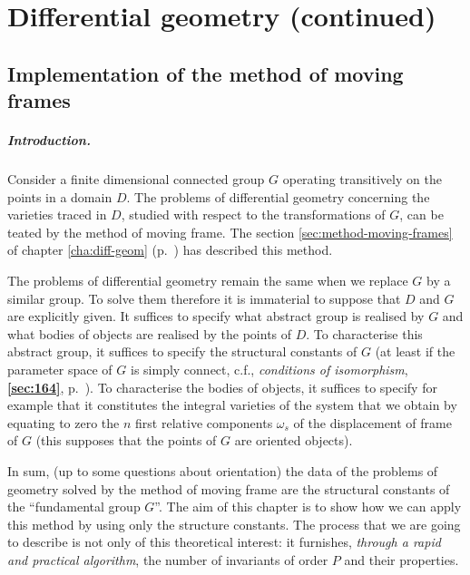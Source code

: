 \documentclass[leqno,11pt]{book}
\numberwithin{equation}{chapter}
\theoremstyle{shape1}
\theoremstyle{shapesmall}
\newcommand{\fsref}[1]{{\rm\textsection\textbf{\ref{sec:#1}}}}
\begin{document}
\chapter{Differential geometry (continued)}
\label{cha:diff-geom-cont}



\section{Implementation of the method of moving frames}
\label{sec:impl-meth-moving}

\paragraph{Introduction.}
\label{sec:170}
Consider a finite dimensional connected group $G$ operating transitively on the points in a domain $D$. The problems of differential geometry concerning the varieties traced in $D$, studied with respect to the transformations of $G$, can be teated by the method of moving frame. The section \ref{sec:method-moving-frames} of chapter \ref{cha:diff-geom} (p.~\pageref{sec:method-moving-frames}) has described this method.

The problems of differential geometry remain the same when we replace $G$ by a similar group. To solve them therefore it is immaterial to suppose that $D$ and $G$ are explicitly given. It suffices to specify what abstract group is realised by $G$ and what bodies of objects are realised by the points of $D$. To characterise this abstract group, it suffices to specify the structural constants of $G$ (at least if the parameter space of $G$ is simply connect, c.f., \emph{conditions of isomorphism}, \fsref{164}, p.~\pageref{sec:164}). To characterise the bodies of objects, it suffices to specify for example that it constitutes the integral varieties of the system that we obtain by equating to zero the $n$ first relative components $\omega_{s}$ of the displacement of frame of $G$ (this supposes that the points of $G$ are oriented objects).

In sum, (up to some questions about orientation) the data of the problems of geometry solved by the method of moving frame are the structural constants of the ``fundamental group $G$''. The aim of this chapter is to show how we can apply this method by using only the structure constants. The process that we are going to describe is not only of this theoretical interest: it furnishes, \emph{through a rapid and practical algorithm}, the number of invariants of order $P$ and their properties.
\end{document}
